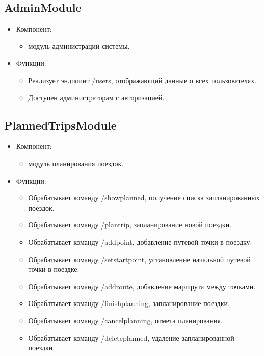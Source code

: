 \documentclass[areasetadvanced]{scrartcl}
\begin{document}
\subsection{AdminModule}
\begin{itemize}
  \item Компонент: 
  \begin{itemize}
    \item модуль администрации системы.
  \end{itemize} 
  \item Функции: 
  \begin{itemize}
    \item Реализует эндпоинт /users, отображающий данные о всех пользователях.
    \item Доступен администраторам с авторизацией.
  \end{itemize}
\end{itemize}


\newpage

\subsection{PlannedTripsModule}
\begin{itemize}
  \item Компонент: 
  \begin{itemize}
    \item модуль планирования поездок.
  \end{itemize} 
  \item Функции: 
  \begin{itemize}
    \item Обрабатывает команду /showplanned, получение списка запланированных поездок.
    \item Обрабатывает команду /plantrip, запланирование новой поездки.
    \item Обрабатывает команду /addpoint, добавление путевой точки в поездку.
    \item Обрабатывает команду /setstartpoint, установление начальной путевой точки в поездке.
    \item Обрабатывает команду /addroute, добавление маршрута между точками.
    \item Обрабатывает команду /finishplanning, запланирование поездки.
    \item Обрабатывает команду /cancelplanning, отмета планирования.
    \item Обрабатывает команду /deleteplanned, удаление запланированной поездки.
  \end{itemize}
\end{itemize}
\end{document}
